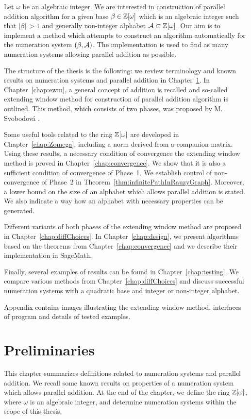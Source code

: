 Let $\omega$ be an algebraic integer. We are interested in construction of parallel addition algorithm for a given base $\beta\in\mathbb{Z}[\omega]$ which is an algebraic integer such that $|\beta|\,>\!1$ and generally non-integer alphabet $\mathcal{A}\subset\mathbb{Z}[\omega]$. Our aim is to implement a method which attempts to construct an algorithm automatically for the numeration system $(\beta,\mathcal{A})$. The implementation is used to find as many numeration systems allowing parallel addition as possible. 

The structure of the thesis is the following: we review terminology and known results on numeration systems and parallel addition in Chapter~\ref{chap:preliminaries}. In Chapter~\ref{chap:ewm}, a general concept of addition is recalled and so-called extending window method for construction of parallel addition algorithm is outlined. This method, which consists of two phases, was proposed by M. Svobodov\'a \cite{milena}. 

Some useful tools related to the ring $\mathbb{Z}[\omega]$ are developed in Chapter~\ref{chap:Zomega}, including a norm derived from a companion matrix. Using these results, a necessary condition of convergence the extending window method is proved in Chapter~\ref{chap:convergence}. We show that it is also a sufficient condition of convergence of Phase~1. We establish control of non-convergence of Phase~2 in Theorem~\ref{thm:infinitePathInRauzyGraph}. Moreover, a lower bound on the size of an alphabet which allows parallel addition is stated. We also indicate a way how an alphabet with necessary properties can be generated.

Different variants of both phases of the extending window method are proposed in Chapter~\ref{chap:diffChoices}. In Chapter~\ref{chap:design}, we present algorithms based on the theorems from Chapter~\ref{chap:convergence} and we describe their implementation in SageMath.

Finally, several examples of results can be found in Chapter~\ref{chap:testing}. We compare various methods from Chapter~\ref{chap:diffChoices} and discuss successful numeration systems with a quadratic base and integer or non-integer alphabet. 

Appendix contains images illustrating the extending window method, interfaces of program and details of tested examples.

\chapter{Preliminaries}
\label{chap:preliminaries}
This chapter summarizes definitions related to numeration systems and parallel addition. We recall some known results on properties of a numeration system which allows parallel addition. At the end of the chapter, we define the ring $\mathbb{Z}[\omega]$, where $\omega$ is an algebraic integer, and determine numeration systems within the scope of this thesis.
	




